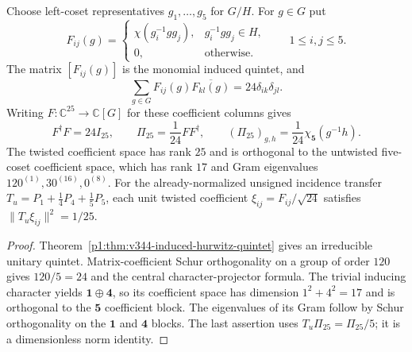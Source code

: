 \documentclass[11pt]{article}
\begin{document}
\begin{theorem}
\label{p1:thm:v344-twisted-25-gram}
Choose left-coset representatives $g_1,\ldots,g_5$ for $G/H$.
For $g\in G$ put
\[
 F_{ij}(g)=
 \begin{cases}
  \chi(g_i^{-1}gg_j),&g_i^{-1}gg_j\in H,\\
  0,&\text{otherwise}.
 \end{cases}
 \qquad 1\leq i,j\leq5.
\]
The matrix $[F_{ij}(g)]$ is the monomial induced quintet, and
\[
 \boxed{\sum_{g\in G}F_{ij}(g)\overline{F_{kl}(g)}
          =24\delta_{ik}\delta_{jl}.}
\]
Writing $F:\mathbb C^{25}\to\mathbb C[G]$ for these coefficient
columns gives
\[
 \boxed{F^\dagger F=24I_{25},\qquad
        \Pi_{25}=\frac1{24}FF^\dagger,\qquad
        (\Pi_{25})_{g,h}=\frac1{24}\chi_{\mathbf5}(g^{-1}h).}
\]
The twisted coefficient space has rank $25$ and is orthogonal to
the untwisted five-coset coefficient space, which has rank $17$
and Gram eigenvalues $120^{(1)},30^{(16)},0^{(8)}$.
For the already-normalized unsigned incidence transfer
$T_u=P_1+\tfrac14P_4+\tfrac15P_5$, each unit twisted coefficient
$\xi_{ij}=F_{ij}/\sqrt{24}$ satisfies
$\|T_u\xi_{ij}\|^2=1/25$.
\end{theorem}
\begin{proof}
Theorem~\ref{p1:thm:v344-induced-hurwitz-quintet} gives an
irreducible unitary quintet.  Matrix-coefficient Schur orthogonality
on a group of order $120$ gives $120/5=24$ and the central
character-projector formula.  The trivial inducing character yields
$\mathbf1\oplus\mathbf4$, so its coefficient space has dimension
$1^2+4^2=17$ and is orthogonal to the $\mathbf5$ coefficient block.
The eigenvalues of its Gram follow by Schur orthogonality on the
$\mathbf1$ and $\mathbf4$ blocks.  The last assertion uses
$T_u\Pi_{25}=\Pi_{25}/5$; it is a dimensionless norm identity.
\end{proof}
\end{document}

